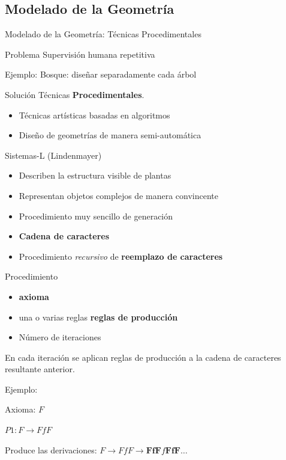 \documentclass[spanish,unknownkeysallowed]{beamer}
\begin{document}
\subsection{Modelado de la Geometría}
\begin{frame}{Modelado de la Geometría: Técnicas Procedimentales}

\begin{block}{Problema}
Supervisión humana repetitiva

Ejemplo: Bosque: diseñar separadamente cada árbol
\end{block}

\vspace{0.5cm}
\begin{block}{Solución}
Técnicas \textbf{Procedimentales}.
\begin{itemize}
\item Técnicas artísticas basadas en algoritmos
\item Diseño de geometrías de manera semi-automática
\end{itemize}
\end{block}

\end{frame}

\begin{frame}{Sistemas-L}
(Lindenmayer)

\begin{itemize}
\item Describen la estructura visible de plantas
\item Representan objetos complejos de manera convincente
\item Procedimiento muy sencillo de generación
\item \textbf{Cadena de caracteres}
\item Procedimiento {\it recursivo} de \textbf{reemplazo de caracteres}
\end{itemize}


\end{frame}

\begin{frame}

Procedimiento
\begin{itemize}
\item \textbf{axioma}
\item una o varias reglas \textbf{reglas de producción}
\item Número de iteraciones
\end{itemize}

En cada iteración se aplican reglas de producción a la cadena de caracteres resultante anterior.

\vspace{1cm}

Ejemplo:

Axioma: $F$

$P1: F \rightarrow FfF$

Produce las derivaciones:
$F \rightarrow FfF \rightarrow \textbf{FfF}f\textbf{FfF} \ldots$

\end{frame}
\end{document}
